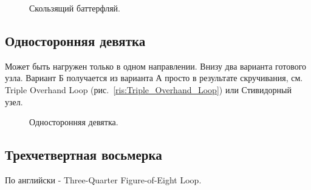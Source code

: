 \begin{figure}[H]\centering
	\caption{Скользящий баттерфляй.}\label{ris:Sliding_butterfly}
\end{figure}

\subsection{Односторонняя девятка}

Может быть нагружен только в одном направлении. Внизу два варианта готового узла. Вариант Б получается из варианта А просто в результате скручивания, см. Triple Overhand Loop (рис.~\ref{ris:Triple_Overhand_Loop}) или Стивидорный узел.

\begin{figure}[H]\centering
	\subfloat[Завязывание]{\label{ris:One_strand_figure_of_nine_1}
	\tcbox[enhanced jigsaw,colframe=black,opacityframe=0.5,opacityback=0.5]
		{\centering
			}
		}
\end{figure}

\begin{figure}[H]\centering
	\subfloat[Завязывание]{\label{ris:One_strand_figure_of_nine_2}
	\tcbox[enhanced jigsaw,colframe=black,opacityframe=0.5,opacityback=0.5]
		{\centering
			}
		}
% 
	\caption{Односторонняя девятка.}\label{ris:One_strand_figure_of_nine}
\end{figure}

\subsection{Трехчетвертная восьмерка}

По английски - Three-Quarter Figure-of-Eight Loop.

\begin{figure}[H]\centering
\end{figure}

